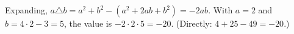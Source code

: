 Expanding, $a\triangle b=a^2+b^2-\left(a^2+2ab+b^2\right)=-2ab$. With $a=2$ and $b=4\cdot2-3=5$, the value is $-2\cdot2\cdot5=\boxed{-20}$. (Directly: $4+25-49=-20$.)
